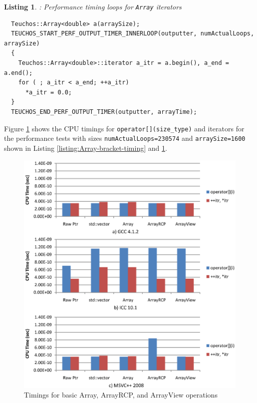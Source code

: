 \documentclass[pdf,ps2pdf,11pt]{SANDreport}
\newtheorem{listing}{Listing}
\begin{document}
\begin{listing}: Performance timing loops for {}\texttt{Array} iterators \\
\label{listing:Array-iterator-timing}
{\small\begin{verbatim}
  Teuchos::Array<double> a(arraySize); 
  TEUCHOS_START_PERF_OUTPUT_TIMER_INNERLOOP(outputter, numActualLoops, arraySize) 
  { 
    Teuchos::Array<double>::iterator a_itr = a.begin(), a_end = a.end(); 
    for ( ; a_itr < a_end; ++a_itr) 
      *a_itr = 0.0; 
  }
  TEUCHOS_END_PERF_OUTPUT_TIMER(outputter, arrayTime); 
\end{verbatim}}
\end{listing}


Figure {}\ref{fig:ArrayTimings} shows the CPU timings for
{}\texttt{operator[](size\_type)} and iterators for the performance
tests with sizes {}\texttt{numActualLoops=230574} and
{}\texttt{arraySize=1600} shown in Listing
{}\ref{listing:Array-bracket-timing} and
{}\ref{listing:Array-iterator-timing}.


{\bsinglespace
\begin{figure}
\begin{center}
\includegraphics*[angle=0,scale=1.00]{ArrayTimings}
\end{center}
\caption{
\label{fig:ArrayTimings}
Timings for basic Array, ArrayRCP, and ArrayView operations}
\end{figure}
\esinglespace}
\end{document}
